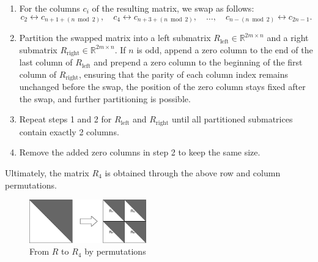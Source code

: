 \documentclass[12pt]{article}
\numberwithin{equation}{section}
\begin{document}
\begin{enumerate}
\item For the columns \( c_i \) of the resulting matrix, we swap as follows:  
   \begin{equation} \label{eq:cswap}
       c_2 \leftrightarrow c_{n + 1 + (n \bmod 2)}, \quad c_4 \leftrightarrow c_{n + 3 + (n \bmod 2)}, \quad \dots, \quad c_{n - (n \bmod 2)} \leftrightarrow c_{2n - 1}.
   \end{equation}  
\item  Partition the swapped matrix into a left submatrix \( R_{\text{left}} \in \mathbb{R}^{2m \times n} \)  and a right submatrix \( R_{\text{right}} \in \mathbb{R}^{2m \times n} \). If \( n \) is odd, append a zero column to the end of the last column of \( R_{\text{left}} \) and prepend a zero column to the beginning of the first column of \( R_{\text{right}} \), ensuring that the parity of each column index remains unchanged before the swap, the position of the zero column stays fixed after the swap, and further partitioning is possible.  
 
\item  Repeat steps 1 and 2 for \( R_{\text{left}} \) and \( R_{\text{right}} \) until all partitioned submatrices contain exactly 2 columns. 
 
\item Remove the added zero columns in step 2 to keep the same size.
\end{enumerate}


 Ultimately, the matrix \( R_4 \) is obtained through the above row and column permutations.

\begin{figure}[htbp]
        \centering
        \includegraphics[width=0.45\textwidth,keepaspectratio=true]{images/Figure_1.png} %
        \caption{From $R$ to $R_4$ by permutations }
        \label{fig:Figure_1}
\end{figure}
\end{document}
